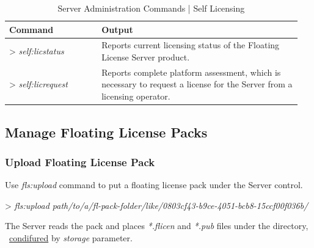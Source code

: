 \documentclass[12pt]{report}
\begin{document}
\begin{table}[ht]
\caption{Server Administration Commands | Self Licensing}
\label{tabular:server-commands-lic}
\begin{center}
	\begin{tabular}{p{0.3\linewidth}p{0.65\linewidth}}
		\textbf{Command} & \textbf{Output} \\  \hline
		\textgreater \textit{ self:licstatus} & Reports current licensing status of the Floating License Server product.\\  \hline
		\textgreater \textit{ self:licrequest} & Reports complete platform assessment, which is necessary to request a license for the Server from a licensing operator. \\  \hline
	\end{tabular}
\end{center}
\end{table}

\subsection*{Manage Floating License Packs} \label{sec:run-fls-commands-lp}

\subsubsection*{Upload Floating License Pack} \label{sec:run-fls-commands-lp-u}

Use \textit{fls:upload} command to put a floating license pack under the Server control. 

\textgreater \textit{ fls:upload path/to/a/fl-pack-folder/like/0803cf43-b9ce-4051-bcb8-15ccf00f036b/}


The Server reads the pack and places \textit{*.flicen} and \textit{*.pub} files under the directory, 
~\hyperref[ch:run-fls-cli]{condifured} by \textit{storage} parameter. 
\end{document}
